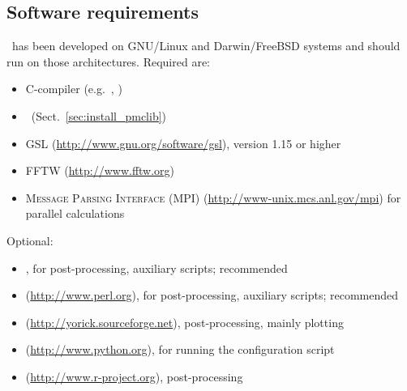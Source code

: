 \documentclass[11pt, chapterprefix, headsepline]{scrartcl}
\begin{document}
\subsection{Software requirements}

\CosmoPMC\ has been developed on GNU/Linux and Darwin/FreeBSD systems
and should run on those architectures. Required are:

\begin{itemize}

  \item C-compiler (e.g.~, )

  \item \pmclib\ (Sect.~\ref{sec:install_pmclib})

  \item GSL (\url{http://www.gnu.org/software/gsl}), version 1.15 or higher

  \item FFTW ({\url{http://www.fftw.org}})

  \item \textsc{Message Parsing Interface
      (MPI)} ({\url{http://www-unix.mcs.anl.gov/mpi}}) for parallel
    calculations

\end{itemize}

\bigskip

Optional:

\begin{itemize}

 \item {}, for post-processing, auxiliary scripts;
    recommended

  \item {} (\url{http://www.perl.org}), for post-processing, auxiliary scripts;
    recommended

  \item {} ({\url{http://yorick.sourceforge.net}}),
    post-processing, mainly plotting

  \item {} (\url{http://www.python.org}), for running the configuration script

  \item {} ({\url{http://www.r-project.org}}), post-processing

\end{itemize}
\end{document}
